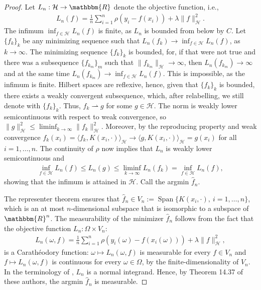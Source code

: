 \documentclass[11pt]{article}
\theoremstyle{definition}
\theoremstyle{remark}
\DeclareMathOperator{\Span}{Span}
\begin{document}
\begin{proof}
Let $L_n: \mathcal{H} \to \mathbbm{R}$ denote the objective function, i.e., 
\begin{align*}
L_n(f)= \frac{1}{n} \sum_{i=1}^n \rho \left( y_i -f(x_i) \right) + \lambda \|f\|_{\mathcal{H}}^2.
\end{align*}
The infimum $\inf_{f \in \mathcal{H}} L_n(f)$ is finite, as $L_n$ is bounded from below by $C$. Let $\{f_k\}_k$ be any minimizing sequence such that $L_n(f_k) \to \inf_{f \in \mathcal{H}} L_n(f)$, as $k \to \infty$. The minimizing sequence $\{f_k\}_k$ is bounded, for, if that were not true and there was a subsequence $\{f_{k_m}\}_m$ such that $\|f_{k_m}\|_{\mathcal{H}} \to \infty$, then $L_n(f_{k_m}) \to \infty$ and at the same time $L_n(f_{k_m}) \to \inf_{f \in \mathcal{H}} L_n(f)$. This is impossible, as the infimum is finite. Hilbert spaces are reflexive, hence, given that $\{f_k\}_k$ is bounded, there exists a weakly convergent subsequence, which, after relabelling, we still denote with $\{f_k\}_k$. Thus, $f_k \rightharpoonup g$ for some $g \in \mathcal{H}$. The norm is weakly lower semicontinuous with respect to weak convergence, so
$\|g\|_{\mathcal{H}}^2 \leq \liminf_{k \to \infty} \|f_k\|_{\mathcal{H}}^2$.
Moreover, by the reproducing property and weak convergence $f_k(x_i) = \langle f_k, K(x_i,\cdot) \rangle_{\mathcal{H}}  \to \langle g, K(x_i,\cdot) \rangle_{\mathcal{H}} = g(x_i)$ for all $i = 1, \ldots, n$. The continuity of $\rho$ now implies that $L_n$ is weakly lower semicontinuous and
\begin{align*}
\inf_{f \in \mathcal{H}}L_n(f) \leq L_n(g) \leq \liminf_{k \to \infty} L_n(f_k) = \inf_{f \in \mathcal{H}}L_n(f),
\end{align*}
showing that the infimum is attained in $\mathcal{H}$. Call the argmin $\widehat{f}_n$.

The representer theorem \citep[Theorem 5.5]{St:2008} ensures that $\widehat{f}_n \in V_n := \Span\{K(x_i, \cdot),\ i=1, \ldots, n\}$, which is an at most $n$-dimensional subspace that is isomorphic to a subspace of $\mathbbm{R}^n$. The measurability of the minimizer $\widehat{f}_n$ follows from the fact that the objective function $L_n: \Omega \times V_n$:
\begin{align*}
L_n(\omega,f) = \frac{1}{n} \sum_{i=1}^n \rho\left( y_{i}(\omega)-f(x_i(\omega)) \right) + \lambda \|f\|_{\mathcal{H}}^2,
\end{align*}
is a Carath\'eodory function: $\omega \mapsto L_n(\omega,f)$ is measurable for every $f \in V_n$ and $f \mapsto L_n(\omega,f)$ is continuous for every $\omega \in \Omega$, by the finite-dimensionality of $V_n$. In the terminology of \citep[Example 14.29][]{Rock:1998}, $L_n$ is a normal integrand. Hence, by Theorem 14.37 of these authors, the argmin $\widehat{f}_n$ is measurable.
\end{proof}
\end{document}
